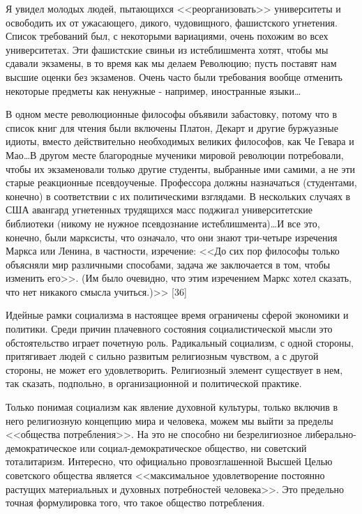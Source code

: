 \documentclass{book}
\begin{document}
{Я увидел молодых людей, пытающихся <<реорганизовать>> университеты и освободить их от ужасающего, дикого, чудо­вищного, фашистского угнетения. Список требований был, с некоторыми вариациями, очень похожим во всех университе­тах. Эти фашистские свиньи из истеблишмента хотят, чтобы мы сдавали экзамены, в то время как мы делаем Революцию; пусть поставят нам высшие оценки без экзаменов. Очень час­то были требования вообще отменить некоторые предметы как ненужные - например, иностранные языки\ldots

В одном месте революционные философы объявили заба­стовку, потому что в список книг для чтения были включены Платон, Декарт и другие буржуазные идиоты, вместо действи­тельно необходимых великих философов, как Че Гевара и Мао\ldots В другом месте благородные мученики мировой революции по­требовали, чтобы их экзаменовали только другие студенты, вы­бранные ими самими, а не эти старые реакционные псевдо­ученые. Профессора должны назначаться (студентами, конеч­но) в соответствии с их политическими взглядами. В несколь­ких случаях в США авангард угнетенных трудящихся масс поджигал университетские библиотеки (никому не нужное псевдознание истеблишмента)\ldots И все это, конечно, были марк­систы, что означало, что они знают три-четыре изречения Маркса или Ленина, в частности, изречение: <<До сих пор философы только объясняли мир различными способами, задача же заклю­чается в том, чтобы изменить его>>. (Им было очевидно, что этим изречением Маркс хотел сказать, что нет никакого смысла учиться.)>> [36]

Идейные рамки социализма в настоящее время ограничены сферой экономики и политики. Среди причин плачевного состояния социалистической мысли это обстоятельство играет почетную роль. Радикальный социализм, с одной стороны, притягивает людей с сильно развитым религиозным чувством, а с другой стороны, не может его удовлетворить. Религиозный элемент существует в нем, так сказать, подпольно, в организационной и политической практике.

Только понимая социализм как явление духовной культуры, только включив в него религиозную концепцию мира и человека, можем мы выйти за пределы <<общества потребления>>. На это не способно ни безрелигиозное либерально-демократическое или социал-демократическое общество, ни советский тоталитаризм. Интересно, что официально провозглашенной Высшей Целью советского общества является <<максимальное удовлетворение постоянно растущих материальных и духовных потребностей человека>>. Это предельно точная формулировка того, что такое общество потребления.

}
\end{document}
